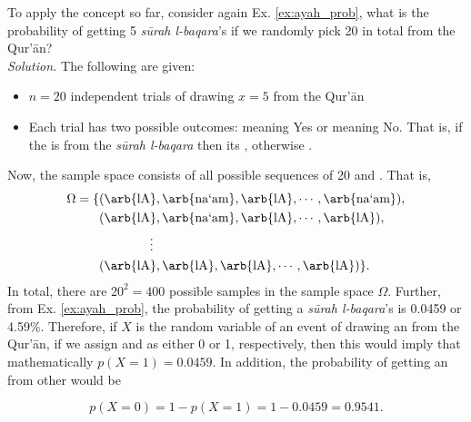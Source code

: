\begin{exmp}\label{ex:binom_manual}
To apply the concept so far, consider again Ex. \ref{ex:ayah_prob}, what is the probability of getting 5 \textit{s\=urah l-baqara}'s   if we randomly pick 20   in total from the Qur'\=an?\\
\textit{Solution.} The following are given:
\begin{itemize}
    \item $n=20$ independent trials of drawing $x=5$  from the Qur'\=an
    \item Each trial has two possible outcomes:   meaning Yes or   meaning No. That is, if the    is from the \textit{s\=urah l-baqara}  then its , otherwise .
\end{itemize}
Now, the sample space consists of all possible sequences of 20  and . That is,
\begin{align}
    \Omega=\{&
        (\text{\arb{lA}},\text{\arb{na`am}},\text{\arb{lA}},\cdots,\text{\arb{na`am}}),\\
        &(\text{\arb{lA}},\text{\arb{na`am}},\text{\arb{lA}},\cdots,\text{\arb{lA}}),\\
        &\qquad\qquad\vdots\\
        &(\text{\arb{lA}},\text{\arb{lA}},\text{\arb{lA}},\cdots,\text{\arb{lA}})\}.
\end{align}
In total, there are $20^2=400$ possible samples in the sample space $\Omega$. Further, from Ex. \ref{ex:ayah_prob}, the probability of getting a \textit{s\=urah l-baqara}'s   is 0.0459 or 4.59\%. Therefore, if $X$ is the random variable of an event of drawing an  from the Qur'\=an, if we assign   and  as either 0 or 1, respectively, then this would imply that mathematically $ p(X=1)=0.0459$. In addition, the probability of getting an   from other   would be

\begin{equation}    
 p(X=0)=1- p(X=1)=1-0.0459=0.9541.
\end{equation}


\end{exmp}
